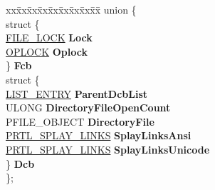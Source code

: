 \begin{DoxyCompactItemize}
\mbox{\label{struct___f_c_b_ac0dbb1f7b1027b7a97daf78ac6c70f53}} 
\begin{tabbing}
xx\=xx\=xx\=xx\=xx\=xx\=xx\=xx\=xx\=\kill
union \{\\
\>struct \{\\
\>\>\hyperlink{struct___f_i_l_e___l_o_c_k}{FILE\_LOCK} {\bfseries Lock}\\
\>\>\hyperlink{interfacevoid}{OPLOCK} {\bfseries Oplock}\\
\>\} {\bfseries Fcb}\\
\>struct \{\\
\>\>\hyperlink{struct___l_i_s_t___e_n_t_r_y}{LIST\_ENTRY} {\bfseries ParentDcbList}\\
\>\>ULONG {\bfseries DirectoryFileOpenCount}\\
\>\>PFILE\_OBJECT {\bfseries DirectoryFile}\\
\>\>\hyperlink{struct___r_t_l___s_p_l_a_y___l_i_n_k_s}{PRTL\_SPLAY\_LINKS} {\bfseries SplayLinksAnsi}\\
\>\>\hyperlink{struct___r_t_l___s_p_l_a_y___l_i_n_k_s}{PRTL\_SPLAY\_LINKS} {\bfseries SplayLinksUnicode}\\
\>\} {\bfseries Dcb}\\
\}; \\


\end{tabbing}
\end{DoxyCompactItemize}

